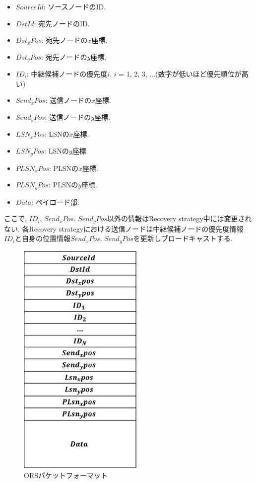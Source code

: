 \documentclass[10pt]{jreport}
\begin{document}
\begin{itemize}
	\item $SourceId$: ソースノードのID.
	\item $DstId$: 宛先ノードのID.
	\item $Dst_x Pos$: 宛先ノードの$x$座標.
	\item $Dst_y Pos$: 宛先ノードの$y$座標.
	\item $ID_i$: 中継候補ノードの優先度$i$. $i$ = 1, 2, 3, ...(数字が低いほど優先順位が高い) 
	\item $Send_x Pos$: 送信ノードの$x$座標.
	\item $Send_y Pos$: 送信ノードの$y$座標.
	\item $LSN_x Pos$: LSNの$x$座標.
	\item $LSN_y Pos$: LSNの$y$座標.
	\item $PLSN_x Pos$: PLSNの$x$座標.
	\item $PLSN_y Pos$: PLSNの$y$座標.
	\item $Data$: ペイロード部.
\end{itemize}

ここで, $ID_i$, $Send_x Pos$, $Send_y Pos$以外の情報はRecovery strategy中には変更されない. 各Recovery strategyにおける送信ノードは中継候補ノードの優先度情報$ID_i$と自身の位置情報$Send_x Pos$, $Send_y Pos$を更新しブロードキャストする.

\begin{figure}[!ht]
	\centering
	\includegraphics[width=60mm]{figures/ORS_packet.eps}
	\caption{ORSパケットフォーマット}
	\label{fig:ORS_packet}
\end{figure}
\end{document}
